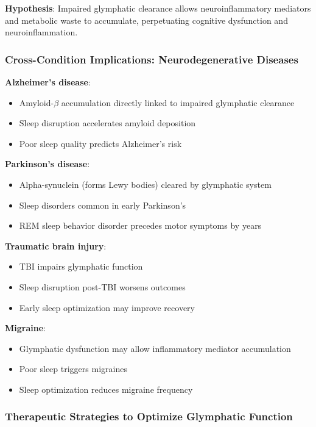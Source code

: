 \textbf{Hypothesis}: Impaired glymphatic clearance allows neuroinflammatory mediators and metabolic waste to accumulate, perpetuating cognitive dysfunction and neuroinflammation.

\subsubsection{Cross-Condition Implications: Neurodegenerative Diseases}

\textbf{Alzheimer's disease}:
\begin{itemize}
    \item Amyloid-$\beta$ accumulation directly linked to impaired glymphatic clearance
    \item Sleep disruption accelerates amyloid deposition
    \item Poor sleep quality predicts Alzheimer's risk
\end{itemize}

\textbf{Parkinson's disease}:
\begin{itemize}
    \item Alpha-synuclein (forms Lewy bodies) cleared by glymphatic system
    \item Sleep disorders common in early Parkinson's
    \item REM sleep behavior disorder precedes motor symptoms by years
\end{itemize}

\textbf{Traumatic brain injury}:
\begin{itemize}
    \item TBI impairs glymphatic function
    \item Sleep disruption post-TBI worsens outcomes
    \item Early sleep optimization may improve recovery
\end{itemize}

\textbf{Migraine}:
\begin{itemize}
    \item Glymphatic dysfunction may allow inflammatory mediator accumulation
    \item Poor sleep triggers migraines
    \item Sleep optimization reduces migraine frequency
\end{itemize}

\subsubsection{Therapeutic Strategies to Optimize Glymphatic Function}

